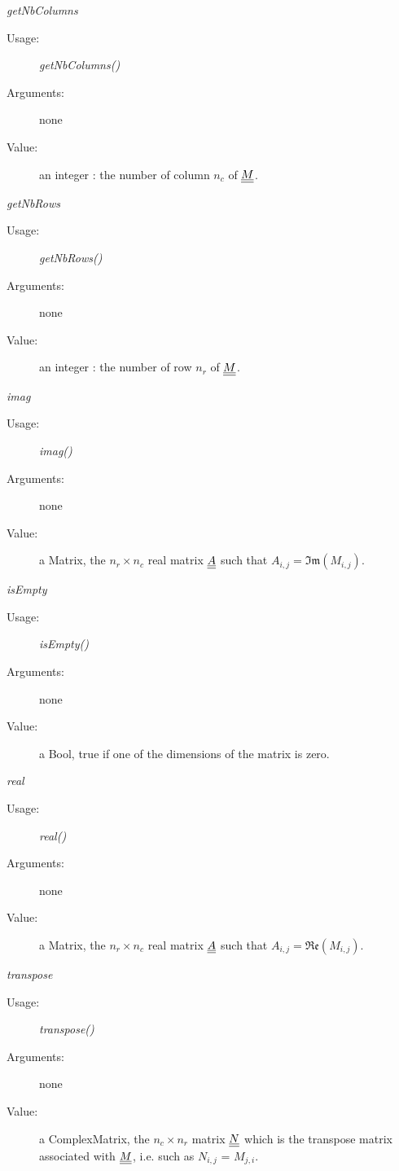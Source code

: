 \begin{description}
\begin{description}
\item \textit{getNbColumns}
\begin{description}
\item[Usage:] \textit{getNbColumns()}
\item[Arguments:] none
\item[Value:] an integer : the number of column $n_c$ of ${\underline{\underline{M}}}$.
\end{description}
\bigskip

\item \textit{getNbRows}
\begin{description}
\item[Usage:] \textit{getNbRows()}
\item[Arguments:] none
\item[Value:] an integer : the number of row $n_r$ of ${\underline{\underline{M}}}$.
\end{description}
\bigskip

\item \textit{imag}
\begin{description}
\item[Usage:] \textit{imag()}
\item[Arguments:] none
\item[Value:] a Matrix, the $n_r\times n_c$ real matrix ${\underline{\underline{A}}}$ such that $A_{i,j}=\mathfrak{Im}(M_{i,j})$.
\end{description}
\bigskip

\item \textit{isEmpty}
\begin{description}
\item[Usage:] \textit{isEmpty()}
\item[Arguments:] none
\item[Value:] a Bool, true if one of the dimensions of the matrix is zero.
\end{description}
\bigskip

\item \textit{real}
\begin{description}
\item[Usage:] \textit{real()}
\item[Arguments:] none
\item[Value:] a Matrix, the $n_r\times n_c$ real matrix ${\underline{\underline{A}}}$ such that $A_{i,j}=\mathfrak{Re}(M_{i,j})$.
\end{description}
\bigskip

\item \textit{transpose}
\begin{description}
\item[Usage:] \textit{transpose()}
\item[Arguments:] none
\item[Value:] a ComplexMatrix, the $n_c\times n_r$ matrix ${\underline{\underline{N}}}$ which is the transpose matrix associated with ${\underline{\underline{M}}}$, i.e.  such as $N_{i,j}$ = $M_{j,i}$.
\end{description}
\bigskip

\end{description}

\end{description}

